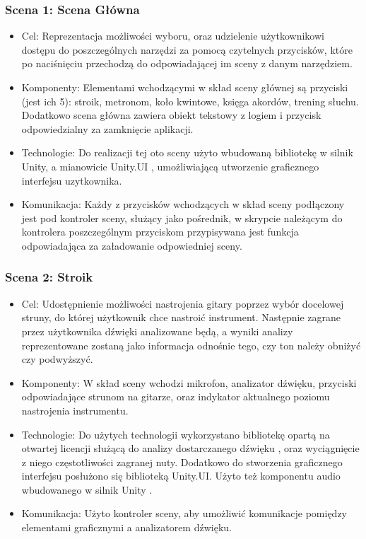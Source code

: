 \subsubsection{Scena 1: Scena Główna}

\begin{itemize}

\item Cel: Reprezentacja możliwości wyboru, oraz udzielenie użytkownikowi dostępu do poszczególnych narzędzi za pomocą czytelnych przycisków, które po naciśnięciu przechodzą do odpowiadającej im sceny z danym narzędziem. 
\item Komponenty: Elementami wchodzącymi w skład sceny głównej są przyciski (jest ich 5): stroik, metronom, koło kwintowe, księga akordów, trening słuchu. Dodatkowo scena główna zawiera obiekt tekstowy z logiem i przycisk odpowiedzialny za zamknięcie aplikacji.  
\item Technologie: Do realizacji tej oto sceny użyto wbudowaną bibliotekę w silnik Unity, a mianowicie Unity.UI \cite{UnityUI}, umożliwiającą utworzenie graficznego interfejsu uzytkownika. 
\item Komunikacja: Każdy z przycisków wchodzących w skład sceny podłączony jest pod kontroler sceny, służący jako pośrednik, w skrypcie należącym do kontrolera poszczególnym przyciskom przypisywana jest funkcja odpowiadająca za załadowanie odpowiedniej sceny. 
\end{itemize}

\subsubsection{Scena 2: Stroik}

\begin{itemize}
\item Cel: Udostępnienie możliwości nastrojenia gitary poprzez wybór docelowej struny, do której użytkownik chce nastroić instrument. Następnie zagrane przez użytkownika dźwięki analizowane będą, a wyniki analizy reprezentowane zostaną jako informacja odnośnie tego, czy ton należy obniżyć czy podwyższyć.
\item Komponenty: W skład sceny wchodzi mikrofon, analizator dźwięku, przyciski odpowiadające strunom na gitarze, oraz indykator aktualnego poziomu nastrojenia instrumentu.  
\item Technologie: Do użytych technologii wykorzystano bibliotekę opartą na otwartej licencji służącą do analizy dostarczanego dźwięku \cite{AudioPitchEstimator}, oraz wyciągnięcie z niego częstotliwości zagranej nuty. Dodatkowo do stworzenia graficznego interfejsu posłużono się biblioteką Unity.UI. Użyto też komponentu audio wbudowanego w silnik Unity \cite{AudioSource}.
\item Komunikacja: Użyto kontroler sceny, aby umożliwić komunikacje pomiędzy elementami graficznymi a analizatorem dźwięku. 
\end{itemize}

